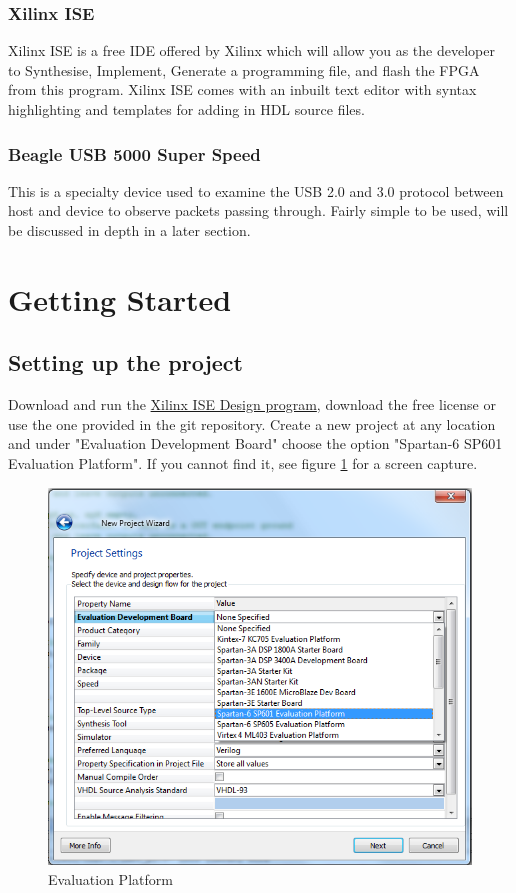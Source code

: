 \documentclass[10pt,a4paper]{article}
\begin{document}
\subsubsection{Xilinx ISE}
Xilinx ISE is a free IDE offered by Xilinx which will allow you as the developer to Synthesise, Implement, Generate a programming file, and flash the FPGA from this program. Xilinx ISE comes with an inbuilt text editor with syntax highlighting and templates for adding in HDL source files.
\subsubsection{Beagle USB 5000 Super Speed}
This is a specialty device used to examine the USB 2.0 and 3.0 protocol between host and device to observe packets passing through. Fairly simple to be used, will be discussed in depth in a later section.
\section{Getting Started}
\subsection{Setting up the project}
Download and run the \href{https://www.xilinx.com/support/download/index.html/content/xilinx/en/downloadNav/design-tools/v2012_4---14_7.html}{Xilinx ISE Design program}, download the free license or use the one provided in the git repository. Create a new project at any location and under "Evaluation Development Board" choose the option "Spartan-6 SP601 Evaluation Platform". If you cannot find it, see figure \ref{fig:Evaluation Platform} for a screen capture.

\begin{figure}
	\includegraphics[width=12cm,height=10cm]{Evaluation_Platform.PNG}
	\caption{Evaluation Platform}
	\label{fig:Evaluation Platform}
\end{figure}
\end{document}
